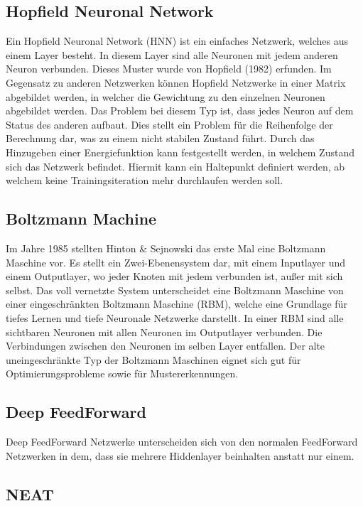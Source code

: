 \subsection{Hopfield Neuronal Network}

Ein Hopfield Neuronal Network (HNN) \cite{demuth2014neural} ist ein einfaches Netzwerk, welches aus einem Layer besteht. 
In diesem Layer sind alle Neuronen mit jedem anderen Neuron verbunden. 
Dieses Muster wurde von Hopfield (1982) erfunden. 
Im Gegensatz zu anderen Netzwerken können Hopfield Netzwerke in einer Matrix abgebildet werden, in welcher die Gewichtung zu den einzelnen Neuronen abgebildet werden. 
Das Problem bei diesem Typ ist, dass jedes Neuron auf dem Status des anderen aufbaut.
Dies stellt ein Problem für die Reihenfolge der Berechnung dar, was zu einem nicht stabilen Zustand führt.
Durch das Hinzugeben einer Energiefunktion kann festgestellt werden, in welchem Zustand sich das Netzwerk befindet. 
Hiermit kann ein Haltepunkt definiert werden, ab welchem keine Trainingsiteration mehr durchlaufen werden soll. 

\subsection{Boltzmann Machine}

Im Jahre 1985 stellten Hinton \& Sejnowski \cite{Hinton:Boltzman:2007} das erste Mal eine Boltzmann Maschine vor.
Es stellt ein Zwei-Ebenensystem dar, mit einem Inputlayer und einem Outputlayer, wo jeder Knoten mit jedem verbunden ist, außer mit sich selbst.
Das voll vernetzte System unterscheidet eine Boltzmann Maschine von einer eingeschränkten Boltzmann Maschine (RBM), welche eine Grundlage für tiefes Lernen und tiefe Neuronale Netzwerke darstellt.
In einer RBM sind alle sichtbaren Neuronen mit allen Neuronen im Outputlayer verbunden. 
Die Verbindungen zwischen den Neuronen im selben Layer entfallen.
Der alte uneingeschränkte Typ der Boltzmann Maschinen eignet sich gut für Optimierungsprobleme sowie für Mustererkennungen.

\subsection{Deep FeedForward}
\label{subsec:DeepFeedForward}

Deep FeedForward Netzwerke unterscheiden sich von den normalen FeedForward Netzwerken in dem, dass sie mehrere Hiddenlayer beinhalten anstatt nur einem.

\subsection{NEAT}

